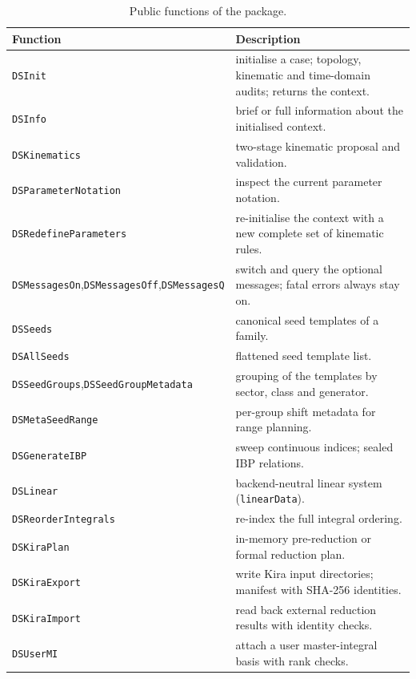 \documentclass[11pt,a4paper]{article}
\begin{document}
\begin{table}[!ht]
\centering
\small
\caption{Public functions of the package.}
\label{tab:api}
\renewcommand{\arraystretch}{1.08}
\begin{tabular}{p{4.3cm}p{9.8cm}}
\toprule
\textbf{Function} & \textbf{Description} \\
\midrule
\texttt{DSInit} & initialise a case; topology, kinematic and time-domain audits; returns the
context. \\
\texttt{DSInfo} & brief or full information about the initialised context. \\
\texttt{DSKinematics} & two-stage kinematic proposal and validation. \\
\texttt{DSParameterNotation} & inspect the current parameter notation. \\
\texttt{DSRedefineParameters} & re-initialise the context with a new complete set of kinematic
rules. \\
\texttt{DSMessagesOn},\newline\texttt{DSMessagesOff},\newline\texttt{DSMessagesQ} & switch and query
the optional messages; fatal errors always stay on. \\
\texttt{DSSeeds} & canonical seed templates of a family. \\
\texttt{DSAllSeeds} & flattened seed template list. \\
\texttt{DSSeedGroups},\newline\texttt{DSSeedGroupMetadata} & grouping of the templates by sector, class and generator. \\
\texttt{DSMetaSeedRange} & per-group shift metadata for range planning. \\
\texttt{DSGenerateIBP} & sweep continuous indices; sealed IBP relations. \\
\texttt{DSLinear} & backend-neutral linear system (\texttt{linearData}). \\
\texttt{DSReorderIntegrals} & re-index the full integral ordering. \\
\texttt{DSKiraPlan} & in-memory pre-reduction or formal reduction plan. \\
\texttt{DSKiraExport} & write Kira input directories; manifest with SHA-256 identities. \\
\texttt{DSKiraImport} & read back external reduction results with identity checks. \\
\texttt{DSUserMI} & attach a user master-integral basis with rank checks. \\

\end{tabular}
\end{table}
\end{document}
